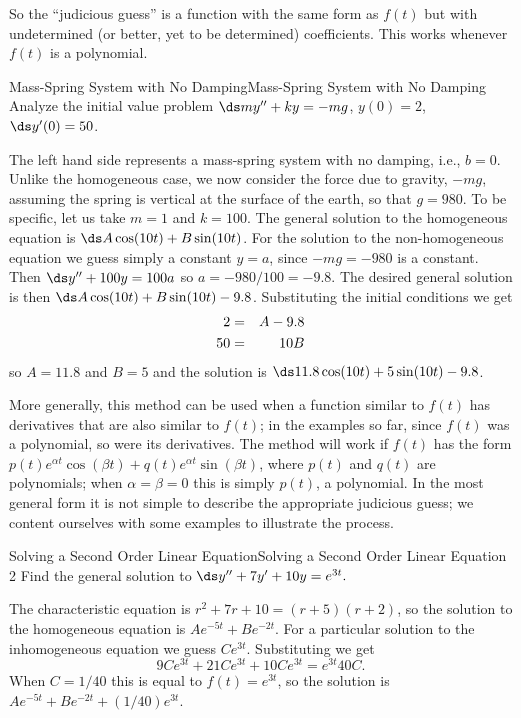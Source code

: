So the ``judicious guess'' is a function with the same form as $f(t)$
but with undetermined (or better, yet to be determined)
coefficients. This works whenever $f(t)$ is a polynomial.

\begin{example}{Mass-Spring System with No Damping}{Mass-Spring System with No Damping}\label{Mass-Spring System with No Damping}
Analyze the initial value problem $\ds my'' +ky=-mg$,
$y(0)=2$, $\ds y'(0)=50$.
\end{example}

\begin{solution}
The left hand side represents a mass-spring
system with no damping, i.e., $b=0$. Unlike the homogeneous case, we
now consider the force due to gravity, $-mg$, assuming the spring is
vertical at the surface of the earth, so that $g=980$. To be specific,
let us take $m=1$ and $k=100$. The general solution to the homogeneous
equation is $\ds A\cos(10t)+B\sin(10t)$. For the solution to the 
non-homogeneous equation we guess simply a constant $y=a$, since $-mg=-980$
is a constant. Then $\ds y''+100y= 100a$ so $a=-980/100=-9.8$. The
desired general solution is then $\ds A\cos(10t)+B\sin(10t)-9.8$.
Substituting the initial conditions we get
\begin{eqnarray*}
2&=&A-9.8\cr
50&=&10B
\end{eqnarray*}
so $A=11.8$ and $B=5$ and the solution is $\ds 11.8\cos(10t)+5\sin(10t)-9.8$.
\end{solution}

More generally, this method can be used when a function similar to
$f(t)$ has derivatives that are also similar to $f(t)$; in the
examples so far, since $f(t)$ was a polynomial, so were its derivatives.
The method will work if $f(t)$ has the form $p(t)e^{\alpha t}\cos(\beta t)+
q(t)e^{\alpha t}\sin(\beta t)$, where $p(t)$ and $q(t)$ are
polynomials; when $\alpha=\beta=0$ this is simply $p(t)$, a
polynomial. In the most general form it is not simple to describe the
appropriate judicious guess; we content ourselves with some examples
to illustrate the process.

\begin{example}{Solving a Second Order Linear Equation}{Solving a Second Order Linear Equation 2}\label{Solving a Second Order Linear Equation 2}
 Find the general solution to $\ds y''+7y'+10y=e^{3t}.$
\end{example}

\begin{solution}
The characteristic equation is $r^2+7r+10=(r+5)(r+2)$,
so the solution to the homogeneous equation is
$Ae^{-5t}+Be^{-2t}$. For a particular solution to the inhomogeneous
equation we guess $Ce^{3t}$. Substituting we get
$$
9Ce^{3t}+21Ce^{3t}+10Ce^{3t}=e^{3t}40C.
$$
When $C=1/40$ this is equal to $f(t)=e^{3t}$, so the solution is
$Ae^{-5t}+Be^{-2t}+(1/40)e^{3t}$.
\end{solution}

